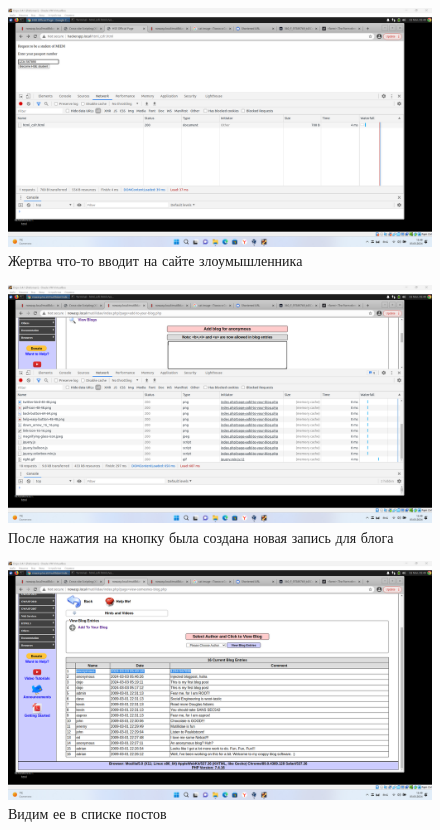 \documentclass[a4paper]{article}
\begin{document}
  \begin{figure}[H]
    \centering
    \includegraphics[width=\textwidth]{Screenshot_52}
    \caption{Жертва что-то вводит на сайте злоумышленника}
  \end{figure}

  \begin{figure}[H]
    \centering
    \includegraphics[width=\textwidth]{Screenshot_53}
    \caption{После нажатия на кнопку была создана новая запись для блога}
  \end{figure}

  \begin{figure}[H]
    \centering
    \includegraphics[width=\textwidth]{Screenshot_54}
    \caption{Видим ее в списке постов}
  \end{figure}
\end{document}
